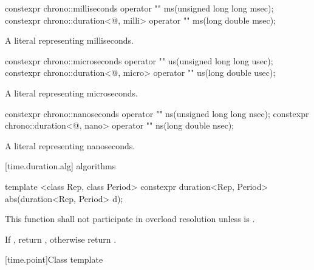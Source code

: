\begin{itemdecl}
constexpr chrono::milliseconds                  operator "" ms(unsigned long long msec);
constexpr chrono::duration<@\unspec@, milli> operator "" ms(long double msec);
\end{itemdecl}

\begin{itemdescr}
\pnum
\returns
A  literal representing  milliseconds.
\end{itemdescr}

\begin{itemdecl}
constexpr chrono::microseconds                  operator "" us(unsigned long long usec);
constexpr chrono::duration<@\unspec@, micro> operator "" us(long double usec);
\end{itemdecl}

\begin{itemdescr}
\pnum
\returns
A  literal representing  microseconds.
\end{itemdescr}

\begin{itemdecl}
constexpr chrono::nanoseconds                  operator "" ns(unsigned long long nsec);
constexpr chrono::duration<@\unspec@, nano> operator "" ns(long double nsec);
\end{itemdecl}

\begin{itemdescr}
\pnum
\returns
A  literal representing  nanoseconds.
\end{itemdescr}

[time.duration.alg]{ algorithms}

%
%
\begin{itemdecl}
template <class Rep, class Period>
  constexpr duration<Rep, Period> abs(duration<Rep, Period> d);
\end{itemdecl}

\begin{itemdescr}
\pnum
\remarks This function shall not participate in overload resolution
unless  is .

\pnum
\returns If , return ,
otherwise return .
\end{itemdescr}

[time.point]{Class template }

